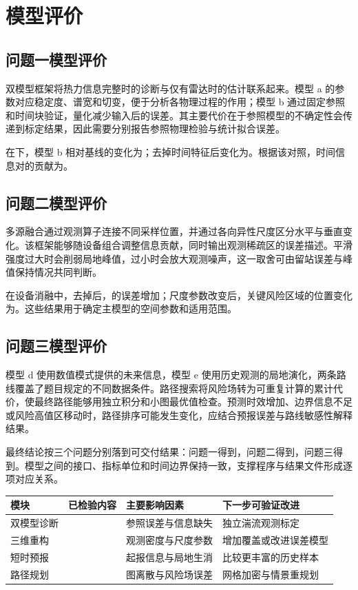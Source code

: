 \section{模型评价}
\subsection{问题一模型评价}
双模型框架将热力信息完整时的诊断与仅有雷达时的估计联系起来。模型 a 的参数对应稳定度、谱宽和切变，便于分析各物理过程的作用；模型 b 通过固定参照和时间块验证，量化减少输入后的误差。其主要代价在于参照模型的不确定性会传递到标定结果，因此需要分别报告参照物理检验与统计拟合误差。

在下，模型 b 相对基线的变化为；去掉时间特征后变化为。根据该对照，时间信息对的贡献为。
\subsection{问题二模型评价}
多源融合通过观测算子连接不同采样位置，并通过各向异性尺度区分水平与垂直变化。该框架能够随设备组合调整信息贡献，同时输出观测稀疏区的误差描述。平滑强度过大时会削弱局地峰值，过小时会放大观测噪声，这一取舍可由留站误差与峰值保持情况共同判断。

在设备消融中，去掉后，的误差增加；尺度参数改变后，关键风险区域的位置变化为。这些结果用于确定主模型的空间参数和适用范围。
\subsection{问题三模型评价}
模型 d 使用数值模式提供的未来信息，模型 e 使用历史观测的局地演化，两条路线覆盖了题目规定的不同数据条件。路径搜索将风险场转为可重复计算的累计代价，使最终路径能够用独立积分和小图最优值检查。预测时效增加、边界信息不足或风险高值区移动时，路径排序可能发生变化，应结合预报误差与路线敏感性解释结果。

最终结论按三个问题分别落到可交付结果：问题一得到，问题二得到，问题三得到。模型之间的接口、指标单位和时间边界保持一致，支撑程序与结果文件形成逐项对应关系。
\begin{table}[H]\centering{}
\begin{tabularx}{\linewidth}{lYYY}\toprule
模块 & 已检验内容 & 主要影响因素 & 下一步可验证改进\\\midrule
双模型诊断 &  & 参照误差与信息缺失 & 独立湍流观测标定\\
三维重构 &  & 观测密度与尺度参数 & 增加覆盖或改进误差模型\\
短时预报 &  & 起报信息与局地生消 & 比较更丰富的历史样本\\
路径规划 &  & 图离散与风险场误差 & 网格加密与情景重规划\\\bottomrule
\end{tabularx}\end{table}
